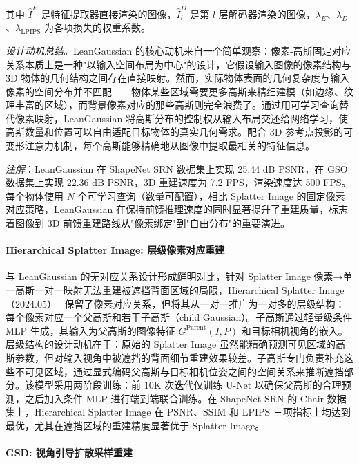 其中 $\hat{I}^E$ 是特征提取器直接渲染的图像，$\hat{I}^D_l$ 是第 $l$ 层解码器渲染的图像，$\lambda_E$、$\lambda_D$、$\lambda_{\mathrm{LPIPS}}$ 为各项损失的权重系数。

\textit{设计动机总结。}\;LeanGaussian 的核心动机来自一个简单观察：像素-高斯固定对应关系本质上是一种"以输入空间布局为中心"的设计，它假设输入图像的像素结构与 3D 物体的几何结构之间存在直接映射。然而，实际物体表面的几何复杂度与输入像素的空间分布并不匹配——物体某些区域需要更多高斯来精细建模（如边缘、纹理丰富的区域），而背景像素对应的那些高斯则完全浪费了。通过用可学习查询替代像素映射，LeanGaussian 将高斯分布的控制权从输入布局交还给网络学习，使高斯数量和位置可以自由适配目标物体的真实几何需求。配合 3D 参考点投影的可变形注意力机制，每个高斯能够精确地从图像中提取最相关的特征信息。

\textit{注解}：LeanGaussian 在 ShapeNet SRN 数据集上实现 25.44 dB PSNR，在 GSO 数据集上实现 22.36 dB PSNR，3D 重建速度为 7.2 FPS，渲染速度达 500 FPS。每个物体使用 $N$ 个可学习查询（数量可配置），相比 Splatter Image 的固定像素对应策略，LeanGaussian 在保持前馈推理速度的同时显著提升了重建质量，标志着图像到 3D 前馈重建路线从"像素绑定"到"自由分布"的重要演进。

\paragraph{Hierarchical Splatter Image: 层级像素对应重建}

与 LeanGaussian 的无对应关系设计形成鲜明对比，针对 Splatter Image 像素→单一高斯一对一映射无法重建被遮挡背面区域的局限，Hierarchical Splatter Image（2024.05）~\cite{2405_20310} 保留了像素对应关系，但将其从一对一推广为一对多的层级结构：每个像素对应一个父高斯和若干子高斯（child Gaussian）。子高斯通过轻量级条件 MLP 生成，其输入为父高斯的图像特征 $G^{\mathrm{Parent}}(I, P)$ 和目标相机视角的嵌入。层级结构的设计动机在于：原始的 Splatter Image 虽然能精确预测可见区域的高斯参数，但对输入视角中被遮挡的背面细节重建效果较差。子高斯专门负责补充这些不可见区域，通过显式编码父高斯与目标相机位姿之间的空间关系来推断遮挡部分。该模型采用两阶段训练：前 10K 次迭代仅训练 U-Net 以确保父高斯的合理预测，之后加入条件 MLP 进行端到端联合训练。在 ShapeNet-SRN 的 Chair 数据集上，Hierarchical Splatter Image 在 PSNR、SSIM 和 LPIPS 三项指标上均达到最优，尤其在遮挡区域的重建精度显著优于 Splatter Image。

\paragraph{GSD: 视角引导扩散采样重建}

